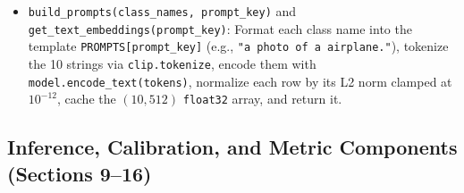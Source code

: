 \documentclass[11pt,a4paper]{article}
\begin{document}
\begin{itemize}
  \item \texttt{build\_\allowbreak{}prompts(\allowbreak{}class\_\allowbreak{}names,\allowbreak{} prompt\_\allowbreak{}key)} and \texttt{get\_\allowbreak{}text\_\allowbreak{}embeddings(\allowbreak{}prompt\_\allowbreak{}key)}: Format each class name into the template \texttt{PROMPTS[prompt\_\allowbreak{}key]} (e.g., \texttt{"a photo of a airplane.\allowbreak{}"}), tokenize the 10 strings via \texttt{clip.\allowbreak{}tokenize}, encode them with \texttt{model.\allowbreak{}encode\_\allowbreak{}text(\allowbreak{}tokens)}, normalize each row by its L2 norm clamped at $10^{-12}$, cache the $(10, 512)$ \texttt{float32} array, and return it.
\end{itemize}

\subsection{Inference, Calibration, and Metric Components (Sections 9--16)}
\end{document}
